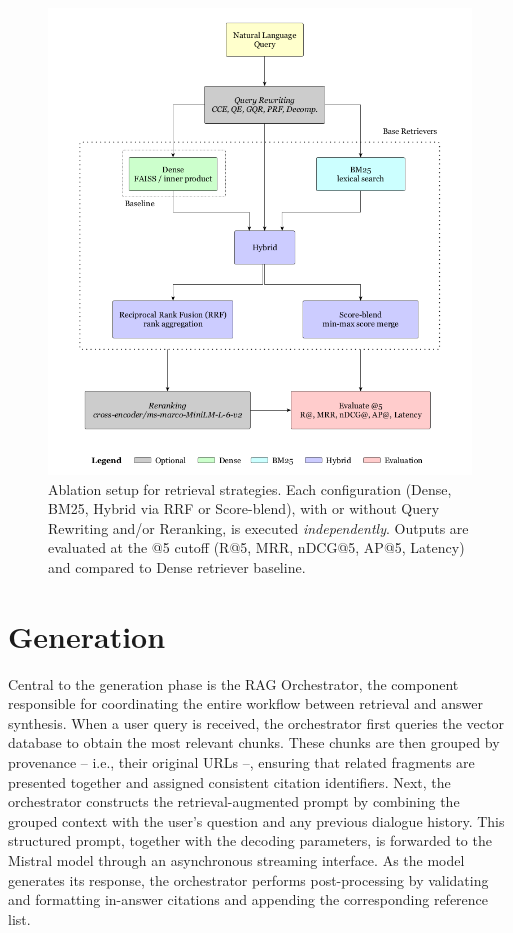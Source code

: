 \begin{spacing}{1.5}
\begin{figure}[H]
  \centering
  \includegraphics[width=\textwidth]{images/evaluation_diagram.png} 
  \caption{Ablation setup for retrieval strategies. Each configuration (Dense, BM25, Hybrid via RRF or Score-blend), with or without Query Rewriting and/or Reranking, is executed \emph{independently}. Outputs are evaluated at the @5 cutoff (R@5, MRR, nDCG@5, AP@5, Latency) and compared to Dense retriever baseline.}
  \label{fig:ablation-setup}
\end{figure}



\section{Generation}\label{sec:rag_generation}
Central to the generation phase is the RAG Orchestrator, the component responsible for coordinating the entire workflow between retrieval and answer synthesis. When a user query is received, the orchestrator first queries the vector database to obtain the most relevant chunks. These chunks are then grouped by provenance -- i.e., their original URLs --, ensuring that related fragments are presented together and assigned consistent citation identifiers. Next, the orchestrator constructs the retrieval-augmented prompt by combining the grouped context with the user’s question and any previous dialogue history. This structured prompt, together with the decoding parameters, is forwarded to the Mistral model through an asynchronous streaming interface. As the model generates its response, the orchestrator performs post-processing by validating and formatting in-answer citations and appending the corresponding reference list.


\end{spacing}
